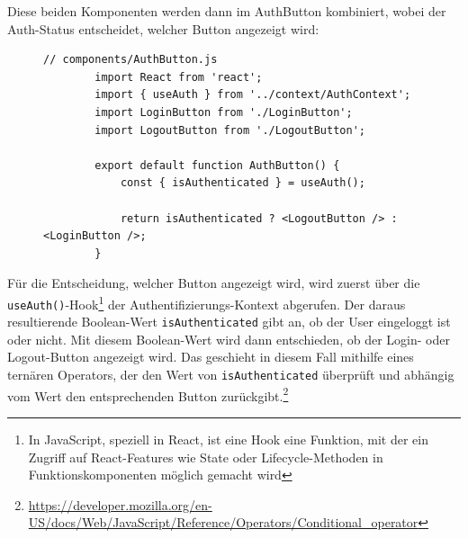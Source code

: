 Diese beiden Komponenten werden dann im AuthButton kombiniert, wobei der Auth-Status entscheidet, 
welcher Button angezeigt wird:
\begin{figure}[H]
    \begin{lstlisting}[caption=JS-Code for the AuthButton, label=list:authbutton]
        // components/AuthButton.js
        import React from 'react';
        import { useAuth } from '../context/AuthContext';
        import LoginButton from './LoginButton';
        import LogoutButton from './LogoutButton';

        export default function AuthButton() {
            const { isAuthenticated } = useAuth();

            return isAuthenticated ? <LogoutButton /> : <LoginButton />;
        }
    \end{lstlisting}
\end{figure}
Für die Entscheidung, welcher Button angezeigt wird, wird zuerst über die \texttt{useAuth()}-Hook\footnote{In JavaScript, speziell in React, ist eine Hook eine Funktion, mit der ein Zugriff auf React-Features wie State oder Lifecycle-Methoden in Funktionskomponenten möglich gemacht wird}
der Authentifizierungs-Kontext abgerufen. Der daraus resultierende Boolean-Wert \texttt{isAuthenticated} gibt an, ob der User eingeloggt ist oder nicht.
Mit diesem Boolean-Wert wird dann entschieden, ob der Login- oder Logout-Button angezeigt wird. Das geschieht in diesem Fall mithilfe eines ternären Operators,
der den Wert von \texttt{isAuthenticated} überprüft und abhängig vom Wert den entsprechenden Button zurückgibt.\footnote{\url{https://developer.mozilla.org/en-US/docs/Web/JavaScript/Reference/Operators/Conditional_operator}}
